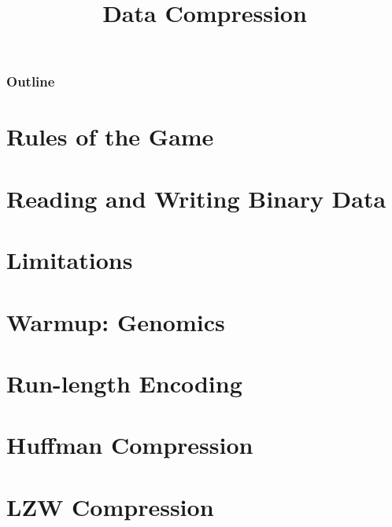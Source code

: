 \documentclass[8pt,a4paper,compress]{beamer}
\title{Data Compression}
\date{}
\begin{document}
\begin{frame}
\vfill
\titlepage
\end{frame}

\begin{frame}
\frametitle{Outline}
\tableofcontents
\end{frame}

\section{Rules of the Game}
\begin{frame}[fragile]
\pause

\end{frame}

\section{Reading and Writing Binary Data}
\begin{frame}[fragile]
\pause

\end{frame}

\section{Limitations}
\begin{frame}[fragile]
\pause

\end{frame}

\section{Warmup: Genomics}
\begin{frame}[fragile]
\pause

\end{frame}

\section{Run-length Encoding}
\begin{frame}[fragile]
\pause

\end{frame}

\section{Huffman Compression}
\begin{frame}[fragile]
\pause

\end{frame}

\section{LZW Compression}
\begin{frame}[fragile]
\pause

\end{frame}
\end{document}
